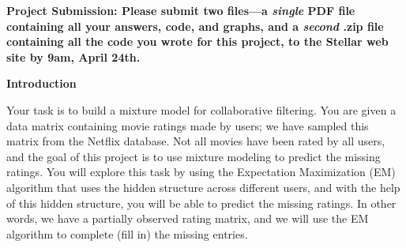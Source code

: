 

\usepackage[pdftex]{graphicx}
\usepackage{amsmath, amsthm, amssymb, amsfonts, mathtools, graphicx, enumerate}
\usepackage{times}
\usepackage{booktabs}
\usepackage{url}
\usepackage{enumerate}
\usepackage{enumitem}

\usepackage{xcolor}

\setlength{\parindent}{0pt}
\setlength{\parskip}{1ex}

\newcommand{\answer}[1]{{\mbox{}\color{red}{#1}}}
\newcommand{\emptycheck}{\text{(\hspace{-.75ex}(\hspace{3ex})\hspace{-.75ex})}}
\newcommand{\checkans}[1]{\text{(\hspace{-.75ex}(\hspace{1ex}{#1}\hspace{1ex})\hspace{-.75ex})}}
\newcommand{\argmax}{{\mbox{arg}\hspace{-.1ex}}\max}

\newcommand{\note}[1]{\textcolor{red}{#1}}




{\bf Project Submission: Please submit two files---a \emph{single} PDF file containing all your answers, code, and graphs, and a
\emph{second} .zip file containing all the code you wrote for this
project, to
the Stellar web site by 9am, April 24th.}

\textbf{Introduction}

Your task is to build a mixture model for collaborative filtering. You are given a data matrix containing movie ratings made by users; we have sampled this matrix from the Netflix database. Not all movies have been rated by all users, and the goal of this project is to use mixture modeling to predict the missing ratings. You will explore this task by using the Expectation Maximization (EM) algorithm that uses the hidden structure across different users, and with the help of this hidden structure, you will be able to predict the missing ratings. In other words, we have a partially observed rating matrix, and we will use the EM algorithm to complete (fill in) the missing entries.

